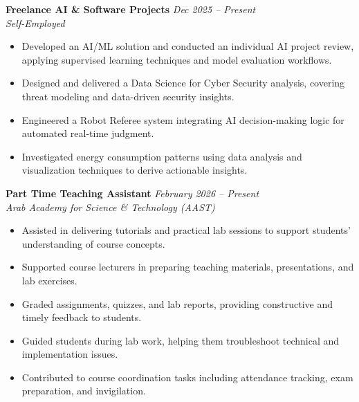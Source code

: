 \documentclass[a4paper,11pt]{article}
\newcommand{\cventry}[4]{%
  \textbf{#1} \hfill \textit{#3} \\
  \textit{#2} \hfill \textit{#4}
  \vspace{2pt}
}
\begin{document}
\cventry{Freelance AI \& Software Projects}{Self-Employed}{Dec 2025 -- Present}{}
\begin{itemize}[leftmargin=1.5em, topsep=2pt, itemsep=1pt]
  \item Developed an AI/ML solution and conducted an individual AI project review, applying supervised learning techniques and model evaluation workflows.
  \item Designed and delivered a Data Science for Cyber Security analysis, covering threat modeling and data-driven security insights.
  \item Engineered a Robot Referee system integrating AI decision-making logic for automated real-time judgment.
  \item Investigated energy consumption patterns using data analysis and visualization techniques to derive actionable insights.
\end{itemize}
\vspace{6pt}

\cventry{Part Time Teaching Assistant}{Arab Academy for Science \& Technology (AAST)}{February 2026 -- Present}{}
\begin{itemize}[leftmargin=1.5em, topsep=2pt, itemsep=1pt]
  \item Assisted in delivering tutorials and practical lab sessions to support students' understanding of course concepts.
  \item Supported course lecturers in preparing teaching materials, presentations, and lab exercises.
  \item Graded assignments, quizzes, and lab reports, providing constructive and timely feedback to students.
  \item Guided students during lab work, helping them troubleshoot technical and implementation issues.
  \item Contributed to course coordination tasks including attendance tracking, exam preparation, and invigilation.
\end{itemize}

\vspace{6pt}

\end{document}
